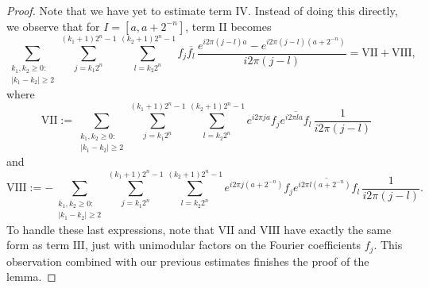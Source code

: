 \documentclass[10pt,a4paper]{amsart}
\begin{document}
\begin{proof}
Note that we have yet to estimate term IV. Instead of doing this directly, we observe that for $I = [a, a+ 2^{-n}]$, term II becomes
\[ 
\sum_{\substack{k_1, k_2 \geq 0:\\ |k_1-k_2| \geq 2}}
\sum_{j=k_1 2^{n}}^{(k_1+1)2^{n}-1} \sum_{l=k_2 2^n}^{(k_2 +1) 2^{n}-1} f_j \overline{f_l} \, 
\frac{e^{i 2 \pi (j-l)a} - e^{i 2 \pi (j-l) (a+2^{-n})}}{i 2\pi (j-l)} = \text{VII} + \text{VIII},
\]
where
\[
\text{VII} := \sum_{\substack{k_1, k_2 \geq 0:\\ |k_1-k_2| \geq 2}}
\sum_{j=k_1 2^{n}}^{(k_1+1)2^{n}-1} \sum_{l=k_2 2^n}^{(k_2 +1) 2^{n}-1} e^{i 2 \pi j a} f_j \overline{e^{i 2 \pi l a} f_l} \, 
    \frac{1}{i 2\pi (j-l)}
\]
and
\[
\text{VIII} := - \sum_{\substack{k_1, k_2 \geq 0:\\ |k_1-k_2| \geq 2}}
\sum_{j=k_1 2^{n}}^{(k_1+1)2^{n}-1} \sum_{l=k_2 2^n}^{(k_2 +1) 2^{n}-1} e^{i 2 \pi j (a + 2^{-n})} f_j \overline{e^{i 2 \pi l (a+ 2^{-n})} f_l} \, 
\frac{1}{i 2\pi (j-l)} .
\]
To handle these last expressions, note that $\text{VII}$ and $\text{VIII}$ have exactly the same form as term $\text{III}$, just with unimodular factors on the Fourier coefficients $f_j$. This observation combined with our previous estimates finishes the proof of the lemma. \end{proof}
\end{document}
